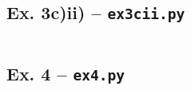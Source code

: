 \documentclass[9pt,a4paper]{tau-class/tau}
\theoremstyle{definition}
\numberwithin{definition}{subsection}
\numberwithin{theorem}{subsection}
\numberwithin{example}{subsection}
\numberwithin{observation}{subsection}
\numberwithin{lemma}{subsection}
\begin{document}
\subsection*{Ex. 3c)ii) -- \texttt{ex3cii.py}}
\inputminted[fontsize=\scriptsize, linenos, breaklines, frame=lines]{python}{ex3cii.py}

\subsection*{Ex. 4 -- \texttt{ex4.py}}
\inputminted[fontsize=\scriptsize, linenos, breaklines, frame=lines]{python}{ex4.py}
\end{document}
